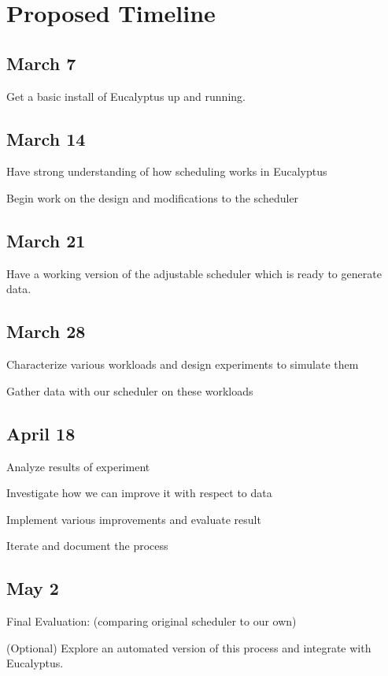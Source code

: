 \section{Proposed Timeline}
\subsection{March 7}
\begin{itemize*}
  \item Get a basic install of Eucalyptus up and running.
\end{itemize*}
\subsection{March 14}
\begin{itemize*}
  \item Have strong understanding of how scheduling works in Eucalyptus
  \item Begin work on the design and modifications to the scheduler
\end{itemize*}
\subsection{March 21}
\begin{itemize*}
  \item Have a working version of the adjustable scheduler which is ready to
    generate data.
\end{itemize*}
\subsection{March 28}
\begin{itemize*}
  \item Characterize various workloads and design experiments to simulate them
  \item Gather data with our scheduler on these workloads
\end{itemize*}
\subsection{April 18}
\begin{itemize*}
  \item Analyze results of experiment
  \item Investigate how we can improve it with respect to data
  \item Implement various improvements and evaluate result
  \item Iterate and document the process
\end{itemize*}
\subsection{May 2}
\begin{itemize*}
  \item Final Evaluation: (comparing original scheduler to our own)
  \item (Optional) Explore an automated version of this process and integrate
    with Eucalyptus.
\end{itemize*}
